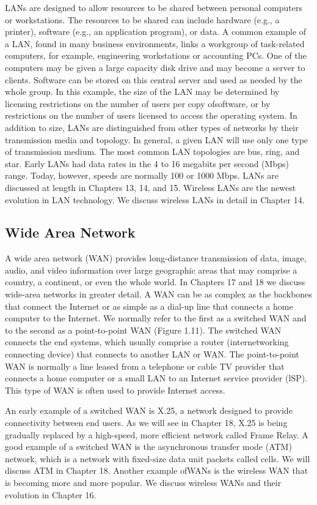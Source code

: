 LANs are designed to allow resources to be shared between personal computers or workstations. The resources to be shared can include hardware (e.g., a printer), software (e.g., an application program), or data. A common example of a LAN, found in many business environments, links a workgroup of task-related computers, for example, engineering workstations or accounting PCs. One of the computers may be given a large capacity disk drive and may become a server to clients. Software can be stored on this central server and used as needed by the whole group. In this example, the size of the LAN may be determined by licensing restrictions on the number of users per copy ofsoftware, or by restrictions on the number of users licensed to access the operating system. In addition to size, LANs are distinguished from other types of networks by their transmission media and topology. In general, a given LAN will use only one type of transmission medium. The most common LAN topologies are bus, ring, and star. Early LANs had data rates in the 4 to 16 megabits per second (Mbps) range. Today, however, speeds are normally 100 or 1000 Mbps. LANs are discussed at length in Chapters 13, 14, and 15. Wireless LANs are the newest evolution in LAN technology. We discuss wireless LANs in detail in Chapter 14.

\subsection*{Wide Area Network}
A wide area network (WAN) provides long-distance transmission of data, image, audio, and video information over large geographic areas that may comprise a country, a continent, or even the whole world. In Chapters 17 and 18 we discuss wide-area networks in greater detail. A WAN can be as complex as the backbones that connect the Internet or as simple as a dial-up line that connects a home computer to the Internet. We normally refer to the first as a switched WAN and to the second as a point-to-point WAN (Figure 1.11). The switched WAN connects the end systems, which usually comprise a router (internetworking connecting device) that connects to another LAN or WAN. The point-to-point WAN is normally a line leased from a telephone or cable TV provider that connects a home computer or a small LAN to an Internet service provider (lSP). This type of WAN is often used to provide Internet access.

An early example of a switched WAN is X.25, a network designed to provide connectivity between end users. As we will see in Chapter 18, X.25 is being gradually replaced by a high-speed, more efficient network called Frame Relay. A good example of a switched WAN is the asynchronous transfer mode (ATM) network, which is a network with fixed-size data unit packets called cells. We will discuss ATM in Chapter 18. Another example ofWANs is the wireless WAN that is becoming more and more popular. We discuss wireless WANs and their evolution in Chapter 16.

